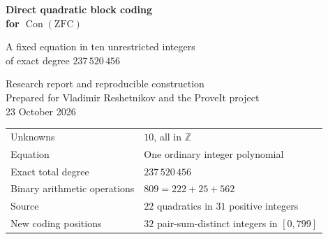 \documentclass[11pt,a4paper]{article}
\theoremstyle{remark}
\newcommand{\Z}{\mathbb Z}
\newcommand{\Con}{\operatorname{Con}}
\begin{document}
\hypersetup{pageanchor=false}
\begin{titlepage}
\vspace*{10mm}
{\color{ink}\Huge\bfseries Direct quadratic block coding\\[4mm]
for \(\Con(\mathrm{ZFC})\)\par}
\vspace{8mm}
{\Large A fixed equation in ten unrestricted integers\\
of exact degree \(237\,520\,456\)\par}
\vspace{10mm}
{\large Research report and reproducible construction\\
Prepared for Vladimir Reshetnikov and the ProveIt project\\
23 October 2026\par}
\vspace{10mm}
\noindent\begin{tabular}{@{}ll@{}}
\toprule
Unknowns & \(10\), all in \(\Z\)\\
Equation & One ordinary integer polynomial\\
Exact total degree & \(237\,520\,456\)\\
Binary arithmetic operations & \(809=222+25+562\)\\
Source & \(22\) quadratics in \(31\) positive integers\\
New coding positions & \(32\) pair-sum-distinct integers in \([0,799]\)\\
\bottomrule
\end{tabular}
\vspace{7mm}
\begin{abstract}
We replace the exponentially spaced scalar source coding in ProveIt's
ten-integer consistency equation by a direct encoding of its entire
quadratic residual system. A finite Sidon set distinguishes all quadratic
monomials. Reversed residual blocks share one carry test, while their
marked coefficients remain isolated even though the product blocks overlap.
This avoids both the quartic sum of squares and the powers-of-five
position scheme.

For the same fixed \(121\times8801\) compiler coefficient tuple as the
predecessor, the resulting polynomial has ten unrestricted integer
unknowns, exact degree \(237\,520\,456\), and an \(809\)-operation
division-free circuit. The predecessor has degree
\(589\,042\,901\,992\,797\,851\,562\,527\,064\) and \(1\,442\) operations.
The degree ratio is approximately \(2.48\times10^{18}\).


\end{abstract}
\end{titlepage}
\end{document}
